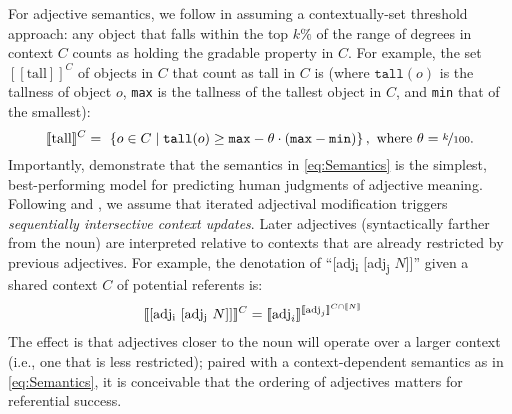 \documentclass[12pt]{article}
\newcommand{\den}[1]{\ensuremath{[\![#1]\!]}}
\begin{document}
For adjective semantics, we follow  in assuming a contextually-set threshold approach: any object that falls within the top $k\%$ of the range of degrees in context $C$ counts as holding the gradable property in $C$. For example, the set $\den{\text{tall}}^C$ of objects in $C$ that count as tall in $C$ is (where $\texttt{tall}(o)$ is the tallness of object $o$, \texttt{max} is the tallness of the tallest object in $C$, and \texttt{min} that of the smallest):
\begin{equation}
\label{eq:Semantics}
\den{\text{tall}}^C  = \ \{ o \in C \mid \texttt{tall}(o) \ge \texttt{max} - \theta \cdot (\texttt{max} - \texttt{min}) \} \,,  \text{ where $\theta = \nicefrac{k}{100}$.} 
\end{equation}
Importantly,  demonstrate that the semantics in \ref{eq:Semantics} is the simplest, best-performing model for predicting human judgments of adjective meaning. 
Following \citeauthor{simonic2018} and \citeauthor{scontrasetalSPadjectives}, we assume that iterated adjectival modification triggers \emph{sequentially intersective context updates}. Later adjectives (syntactically farther from the noun) are interpreted relative to contexts that are already restricted by previous adjectives. For example, the denotation of ``[adj\textsubscript{i} [adj\textsubscript{j} $N$]]'' given a shared context $C$ of potential referents is:
\begin{align}
\label{eq:SequentialInterpretation}
\den{\text{[adj\textsubscript{i} [adj\textsubscript{j} $N$]]}}^{C} & = \den{\text{adj}_i}^{\den{\text{adj}_j}^{C\cap \den{N}}} 
\end{align} 
The effect is that adjectives closer to the noun will operate over a larger context (i.e., one that is less restricted); paired with a context-dependent semantics as in \eqref{eq:Semantics}, it is conceivable that the ordering of adjectives matters for referential success.
\end{document}
